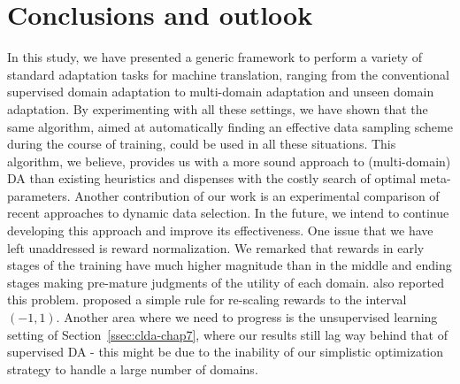 \section{Conclusions and outlook}

In this study, we have presented a generic framework to perform a variety of standard adaptation tasks for machine translation, ranging from the conventional supervised domain adaptation to multi-domain adaptation and unseen domain adaptation. By experimenting with all these settings, we have shown that the same algorithm, aimed at automatically finding an effective data sampling scheme during the course of training, could be used in all these situations. This algorithm, we believe, provides us with a more sound approach to (multi-domain) DA than existing heuristics and dispenses with the costly search of optimal meta-parameters. Another contribution of our work is an experimental comparison of recent approaches to dynamic data selection. In the future, we intend to continue developing this approach and improve its effectiveness. One issue that we have left unaddressed is reward normalization. We remarked that rewards in early stages of the training have much higher magnitude than in the middle and ending stages making pre-mature judgments of the utility of each domain. \citet{Kumar19reinforcement} also reported this problem. \citet{Graves17automated} proposed a simple rule for re-scaling rewards to the interval $(-1,1)$. Another area where we need to progress is the unsupervised learning setting of Section~\ref{ssec:clda-chap7}, where our results still lag way behind that of supervised DA - this might be due to the inability of our simplistic optimization strategy to handle a large number of domains.